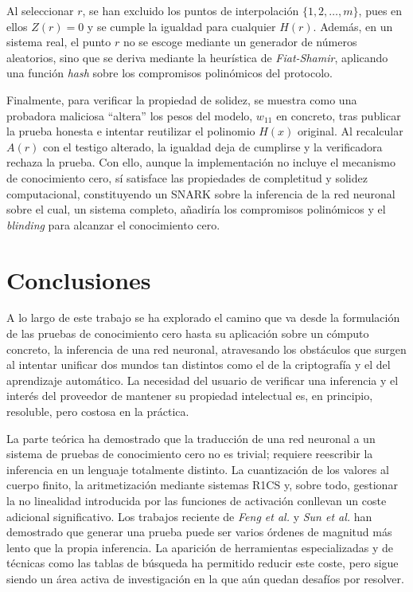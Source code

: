 \documentclass[a4paper, 11pt]{article}
\begin{document}
Al seleccionar $r$, se han excluido los puntos de interpolación $\{1, 2, \ldots, m\}$, pues en ellos
$Z(r) = 0$ y se cumple la igualdad para cualquier $H(r)$. Además, en un sistema real, el punto $r$
no se escoge mediante un generador de números aleatorios, sino que se deriva mediante la heurística
de \textit{Fiat-Shamir}, aplicando una función \textit{hash} sobre los compromisos polinómicos del
protocolo.

Finalmente, para verificar la propiedad de solidez, se muestra como una probadora maliciosa ``altera''
los pesos del modelo, $w_{11}$ en concreto, tras publicar la prueba honesta e intentar reutilizar el
polinomio $H(x)$ original. Al recalcular $A(r)$ con el testigo alterado, la igualdad deja de cumplirse
y la verificadora rechaza la prueba. Con ello, aunque la implementación no incluye el mecanismo de
conocimiento cero, sí satisface las propiedades de completitud y solidez computacional, constituyendo
un SNARK sobre la inferencia de la red neuronal sobre el cual, un sistema completo, añadiría los
compromisos polinómicos y el \textit{blinding} para alcanzar el conocimiento cero.

\pagebreak

\section{Conclusiones} \label{conclusiones}

A lo largo de este trabajo se ha explorado el camino que va desde la formulación de las pruebas de
conocimiento cero hasta su aplicación sobre un cómputo concreto, la inferencia de una red neuronal,
atravesando los obstáculos que surgen al intentar unificar dos mundos tan distintos como el de la
criptografía y el del aprendizaje automático. La necesidad del usuario de verificar una inferencia y
el interés del proveedor de mantener su propiedad intelectual es, en principio, resoluble, pero
costosa en la práctica.

La parte teórica ha demostrado que la traducción de una red neuronal a un sistema de pruebas de
conocimiento cero no es trivial; requiere reescribir la inferencia en un lenguaje totalmente
distinto. La cuantización de los valores al cuerpo finito, la aritmetización mediante sistemas R1CS y,
sobre todo, gestionar la no linealidad introducida por las funciones de activación conllevan un coste
adicional significativo. Los trabajos reciente de \textit{Feng et al.} \cite{feng2021zen} y
\textit{Sun et al.} \cite{sun2024zkllm} han demostrado que generar una prueba puede ser varios
órdenes de magnitud más lento que la propia inferencia. La aparición de herramientas especializadas
y de técnicas como las tablas de búsqueda ha permitido reducir este coste, pero sigue siendo un área
activa de investigación en la que aún quedan desafíos por resolver.
\end{document}
